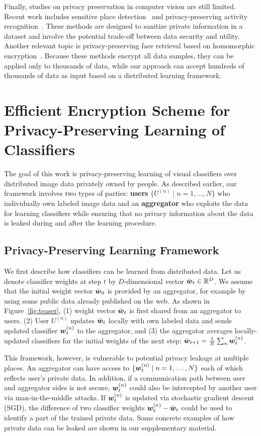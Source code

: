 \documentclass[10pt,twocolumn,letterpaper]{article}
\def\vct#1{\mbox{\boldmath $#1$}}
\def\ui#1{^{(#1)}}
\begin{document}
Finally, studies on privacy preservation in computer vision are still limited. Recent work includes sensitive place detection~\cite{Fan2016a,Korayem2016a,Templeman2014a} and privacy-preserving activity recognition~\cite{Ryoo2017a}. These methods are designed to sanitize private information in a dataset and involve the potential trade-off between data security and utility. Another relevant topic is privacy-preserving face retrieval based on homomorphic encryption~\cite{Erkin2009a,Sadeghi2010a}. Because these methods encrypt all data samples, they can be applied only to thousands of data, while our approach can accept hundreds of thousands of data as input based on a distributed learning framework.

\section{Efficient Encryption Scheme for Privacy-Preserving Learning of Classifiers}
\label{sec:secsum}

The goal of this work is privacy-preserving learning of visual classifiers over distributed image data privately owned by people. As described earlier, our framework involves two types of parties: {\bf users} $\{U\ui{n}\mid n=1,\dots,N\}$ who individually own labeled image data and an {\bf aggregator} who exploits the data for learning classifiers while ensuring that no privacy information about the data is leaked during and after the learning procedure.

\subsection{Privacy-Preserving Learning Framework}
\label{subsec:framework}
We first describe how classifiers can be learned from distributed data. Let us denote classifier weights at step $t$ by $D$-dimensional vector $\bar{\vct{w}}_t\in\mathbb{R}^{D}$. We assume that the initial weight vector $\bar{\vct{w}}_0$ is provided by an aggregator, for example by using some public data already published on the web. As shown in Figure~\ref{fig:teaser}, (1) weight vector $\bar{\vct{w}}_t$ is first shared from an aggregator to users. (2) User $U\ui{n}$ updates $\bar{\vct{w}}_{t}$ locally with own labeled data and sends updated classifier $\vct{w}\ui{n}_t$ to the aggregator, and (3) the aggregator averages locally-updated classifiers for the initial weights of the next step: $\bar{\vct{w}}_{t+1} = \frac{1}{N}\sum_n \vct{w}\ui{n}_t$.

This framework, however, is vulnerable to potential privacy leakage at multiple places. An aggregator can have access to $\{\vct{w}\ui{n}_t\mid n=1,\dots, N\}$ each of which reflects user's private data. In addition, if a communication path between user and aggregator sides is not secure, $\vct{w}\ui{n}_t$ could also be intercepted by another user via man-in-the-middle attacks. If $\vct{w}\ui{n}_t$ is updated via stochastic gradient descent (SGD), the difference of two classifier weights $\vct{w}\ui{n}_t - \bar{\vct{w}}_{t}$ could be used to identify a part of the trained private data. Some concrete examples of how private data can be leaked are shown in our supplementary material.
\end{document}

